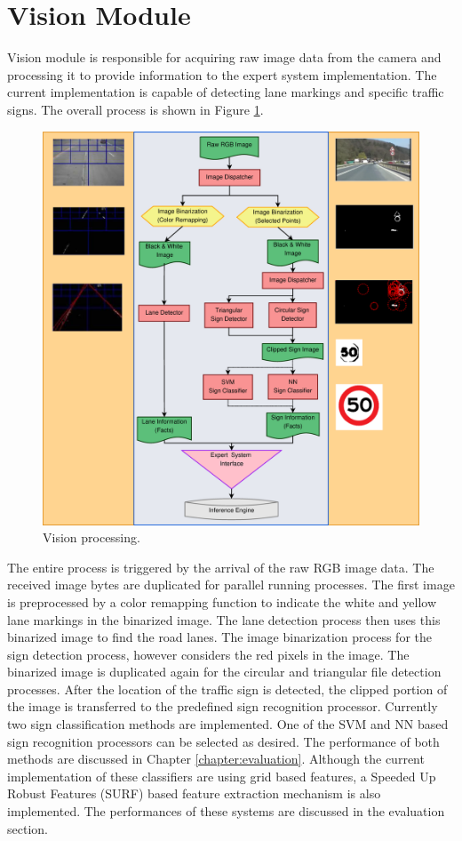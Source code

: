 \documentclass[a4paper,oneside,12pt]{report}
\begin{document}
\section{Vision Module}
Vision module is responsible for acquiring raw image data from the camera and processing it to provide information to the expert system implementation. The current implementation is capable of detecting lane markings and specific traffic signs. The overall process is shown in Figure \ref{fig:vision}.
\begin{figure}[ht]
\begin{center}
\includegraphics[width=140mm]{img/vision.eps}
\caption{Vision processing.}
\label{fig:vision}
\end{center}
\end{figure}
The entire process is triggered by the arrival of the raw RGB image data. The received image bytes are duplicated for parallel running processes. The first image is preprocessed by a color remapping function to indicate the white and yellow lane markings in the binarized image. The lane detection process then uses this binarized image to find the road lanes. The image binarization process for the sign detection process, however considers the red pixels in the image. The binarized image is duplicated again for the circular and triangular file detection processes. After the location of the traffic sign is detected, the clipped portion of the image is transferred to the predefined sign recognition processor. Currently two sign classification methods are implemented. One of the SVM and NN based sign recognition processors can be selected as desired. The performance of both methods are discussed in Chapter \ref{chapter:evaluation}. Although the current implementation of these classifiers are using grid based features, a Speeded Up Robust Features (SURF) \cite{bay_speeded-up_2008} based feature extraction mechanism is also implemented. The performances of these systems are discussed in the evaluation section.
\end{document}
